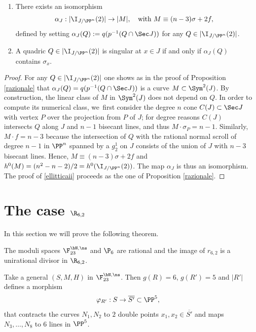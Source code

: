 \skpt
\begin{prop}\label{ellittica}
\begin{enumerate}
\item\label{ellitticai}
There exists an isomorphism
\[
\alpha_J: |\I_{J/\PP^n}(2)|\to |M|, \quad\text{with }M\equiv (n-3)\sigma+2f,
\]
defined by setting $\alpha_J(Q):=q(p^{-1}(Q\cap\Sec J))$ for any $Q\in |\I_{J/\PP^n}(2)|$.
\item\label{ellitticaii}
A quadric $Q\in |\I_{J/\PP^n}(2)|$ is singular at $x\in J$ if and only if $\alpha_J(Q)$ contains $\sigma _x$.
\end{enumerate}
\end{prop}

\begin{proof}
For any $Q\in |\I_{J/\PP^n}(2)|$ one shows as in the proof of Proposition \ref{razionale} that $\alpha_J(Q)=q(p^{-1}(Q\cap\Sec J))$ is a curve $M\subset\Sym^2(J)$. By construction, the linear class of $M$ in $\Sym^2(J)$ does not depend on $Q$. In order to compute its numerical class, we~first consider the degree $n$ cone $C(J)\subset \Sec J$ with vertex $P$ over the projection from $P$ of $J$; for degree reasons $C(J)$ intersects $Q$ along $J$ and $n-1$ bisecant lines, and thus $M\cdot \sigma_P=n-1$. Similarly,  $M\cdot f=n-3$ because the intersection of $Q$ with the rational normal scroll of degree $n-1$ in $\PP^n$ spanned by a $g^1_2$ on $J$ consists of the union of $J$ with $n-3$ bisecant lines. Hence, $M\equiv (n-3)\sigma+2f$ and $h^0(M)=(n^2-n-2)/2=h^0(\I_{J/\PP^n}(2))$. The map $\alpha_J$ is thus an isomorphism. The proof of \eqref{ellitticaii} proceeds as the one of Proposition \ref{razionale}.
\end{proof}

\section{The case \texorpdfstring{$\R_{6,2}$}{R}}

In this section we will prove the following theorem.

\begin{thm}\label{seidue}
The moduli spaces $\F_{23}^{\bN,\ns}$ and $\P_{6}$ are rational and the image of $r_{6,2}$ is a unirational divisor in $\R_{6,2}$.
\end{thm}

Take a general $(S,M,H)$ in $\F_{23}^{\bN,\ns}$. Then $g(R)=6$, $g(R')=5$ and $|R'|$ defines a morphism
\[
\varphi_{R'}:S\to \overline{S'}\subset \PP^5,
\]
that contracts the curves $N_1,N_2$ to $2$ double points $x_1,x_2\in \overline{S'}$ and maps $N_3,\ldots,N_8$ to $6$ lines in $\PP^5$.

